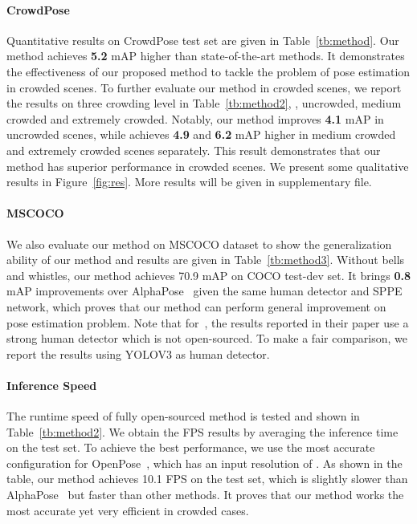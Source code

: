 \documentclass[10pt,twocolumn,letterpaper]{article}
\begin{document}
\paragraph{CrowdPose}
Quantitative results on CrowdPose test set are given in Table~\ref{tb:method}. Our method achieves \textbf{5.2} mAP higher than state-of-the-art methods.  It demonstrates the effectiveness of our proposed method to tackle the problem of pose estimation in crowded scenes. To further evaluate our method in crowded scenes, we report the results on three crowding level in Table~\ref{tb:method2}, \ie, uncrowded, medium crowded and extremely crowded. Notably, our method improves \textbf{4.1} mAP in uncrowded scenes, while achieves \textbf{4.9} and \textbf{6.2} mAP higher in medium crowded and extremely crowded scenes separately. This result demonstrates that our method has superior performance in crowded scenes. We present some qualitative results in Figure~\ref{fig:res}. More results will be given in supplementary file.

\vspace{-0.1in}
\paragraph{MSCOCO}
We also evaluate our method on MSCOCO dataset to show the generalization ability of our method and results are given in Table~\ref{tb:method3}. Without bells and whistles, our method achieves 70.9  mAP on COCO test-dev set. It brings \textbf{0.8} mAP improvements over AlphaPose~\cite{alphapose} given the same human detector and SPPE network, which proves that our method can perform general improvement on pose estimation problem. Note that for~\cite{msra}, the results reported in their paper use a strong human detector which is not open-sourced. To make a fair comparison, we report the results using YOLOV3 as human detector.

\vspace{-0.1in}
\paragraph{Inference Speed}
The runtime speed of fully open-sourced method is tested and shown in Table~\ref{tb:method2}. We obtain the FPS results by averaging the inference time on the test set. To achieve the best performance, we use the most accurate configuration for OpenPose~\cite{openpose}, which has an input resolution of . As shown in the table, our method achieves 10.1 FPS on the test set, which is slightly slower than AlphaPose~\cite{alphapose} but faster than other methods. It proves that our method works the most accurate yet very efficient in crowded cases.
\end{document}
